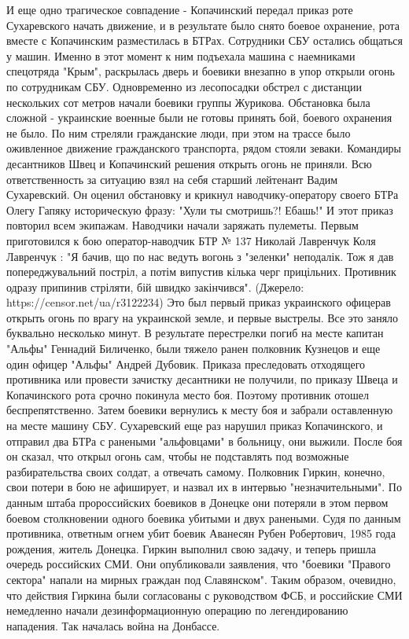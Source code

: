 И еще одно трагическое совпадение - Копачинский передал приказ роте Сухаревского начать движение, и в результате было снято боевое охранение, рота вместе с Копачинским разместилась в БТРах. Сотрудники СБУ остались общаться у машин. 
Именно в этот момент к ним подъехала машина с наемниками спецотряда "Крым", раскрылась дверь и боевики внезапно в упор открыли огонь по сотрудникам СБУ. 
Одновременно из лесопосадки обстрел с дистанции нескольких сот метров начали боевики группы Журикова.
Обстановка была сложной - украинские военные были не готовы принять бой, боевого охранения не было. По ним стреляли гражданские люди, при этом на трассе было оживленное движение гражданского транспорта, рядом стояли зеваки.  
Командиры десантников Швец и Копачинский решения открыть огонь не приняли. Всю ответственность за ситуацию взял на себя старший лейтенант Вадим Сухаревский. 
Он оценил обстановку и крикнул наводчику-оператору своего БТРа Олегу Гапяку историческую фразу:
"Хули ты смотришь?! Ебашь!"
И этот приказ повторил всем экипажам. Наводчики начали заряжать пулеметы. Первым приготовился к бою оператор-наводчик БТР № 137 Николай Лавренчук Коля Лавренчук
: "Я бачив, що по нас ведуть вогонь з "зеленки" неподалік. Тож я дав попереджувальний постріл, а потім випустив кілька черг прицільних. Противник одразу припинив стріляти, бій швидко закінчився". (Джерело: https://censor.net/ua/r3122234)
Это был первый приказ украинского офицерав открыть огонь по врагу на украинской земле, и первые выстрелы.
Все это заняло буквально несколько минут.
В результате перестрелки погиб на месте капитан "Альфы" Геннадий Биличенко, были тяжело ранен полковник Кузнецов и еще один офицер "Альфы" Андрей Дубовик. 
Приказа преследовать отходящего противника или провести зачистку  десантники не получили, по приказу Швеца и Копачинского рота срочно покинула место боя. Поэтому противник отошел беспрепятственно. Затем боевики вернулись к месту боя и забрали оставленную на месте машину СБУ.
Сухаревский еще раз нарушил приказ Копачинского, и отправил два БТРа с ранеными "альфовцами" в больницу, они выжили. После боя он сказал, что открыл огонь сам, чтобы не подставлять под возможные разбирательства своих солдат, а отвечать самому.
Полковник Гиркин, конечно, свои потери в бою не афиширует, и назвал их в интервью "незначительными". 
По данным штаба пророссийских боевиков в Донецке они потеряли в этом первом боевом столкновении одного боевика убитыми и двух ранеными. Судя по данным противника, ответным огнем убит боевик Аванесян Рубен Робертович, 1985 года рождения, житель Донецка. 
Гиркин выполнил свою задачу, и теперь пришла очередь российских СМИ. Они опубликовали заявления, что "боевики "Правого сектора" напали на мирных граждан под Славянском". Таким образом, очевидно, что действия Гиркина были согласованы с руководством ФСБ, и российские СМИ немедленно начали дезинформационную операцию по легендированию нападения. 
Так началась война на Донбассе.
